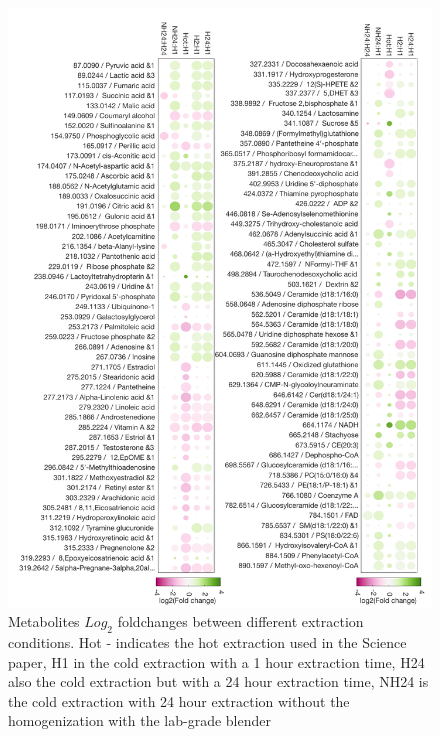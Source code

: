 \documentclass[a4paper]{book}
\begin{document}
	\begin{figure}[!ht]
		\centering
		\includegraphics[keepaspectratio,height=0.8\textheight]{2.Optimizaiton_Figures/bubbles1.pdf}
		\caption{Metabolites $Log_2$ foldchanges between different extraction conditions. Hot - indicates the hot extraction used in the Science paper, H1 in the cold extraction with a 1 hour extraction  time, H24 also the cold extraction but with a 24 hour extraction time, NH24 is the cold extraction with 24 hour extraction without the homogenization with the lab-grade blender}
		\label{fig:Pilor Study 1 Bubble Chart Results}
	\end{figure}
	
\end{document}
